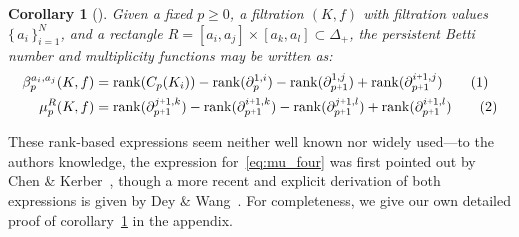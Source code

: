 \documentclass[10pt]{article}
\numberwithin{equation}{section}
\newcommand{\+}{%
	\raisebox{0.18ex}{\scaleobj{0.55}{+}}
}
\newtheorem{proposition}{Proposition}
\newtheorem{corollary}{Corollary}
\theoremstyle{definition}
\theoremstyle{definition}
\newcommand\numberthis{\addtocounter{equation}{1}\tag{\theequation}}
\begin{document}
\begin{corollary}[\cite{chen2011output, dey2022computational}]\label{cor:rank_reduction}
Given a fixed $p \geq 0$, a filtration $(K,f)$ with filtration values $\{ \, a_i \, \}_{i=1}^N$, and a rectangle $R =  [a_i,a_j] \times [a_k,a_l] \subset \Delta_+$,
the persistent Betti number and multiplicity functions may be written as:
	\begin{align*}\label{eq:betti_four}
	\beta_p^{a_i,a_j}(K,f) &= \mathrm{rank}(C_p(K_i)) - \mathrm{rank}(\partial_p^{1,i}) - \mathrm{rank}(\partial_{p\+1 }^{1,j}) + \mathrm{rank}(\partial_{p\+1}^{i \+ 1, j} ) \numberthis  \\
	\mu_p^{R}(K, f) &= \mathrm{rank}(\partial_{p\+1}^{j \+ 1, k})  - \mathrm{rank}(\partial_{p\+1}^{i \+ 1, k})  - \mathrm{rank}(\partial_{p\+1}^{j \+ 1, l}) + \mathrm{rank}(\partial_{p\+1}^{i \+ 1, l}) \numberthis \label{eq:mu_four}
	\end{align*}
\end{corollary}
\noindent These rank-based expressions seem neither well known nor widely used---to the authors knowledge, the expression for~\eqref{eq:mu_four} was first pointed out by Chen \& Kerber~\cite{chen2011output}, though a more recent and explicit derivation of both expressions is given by Dey \& Wang~\cite{dey2022computational}. For completeness, we give our own detailed proof of corollary~\ref{cor:rank_reduction} in the appendix. 

\end{document}
